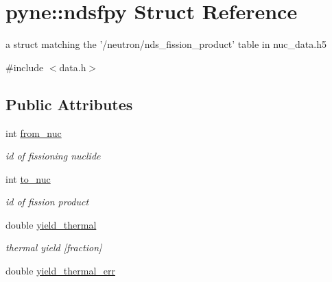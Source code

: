 \hypertarget{structpyne_1_1ndsfpy}{\section{pyne\-:\-:ndsfpy Struct Reference}
\label{structpyne_1_1ndsfpy}
}


a struct matching the '/neutron/nds\-\_\-fission\-\_\-product' table in nuc\-\_\-data.\-h5  




{\ttfamily \#include $<$data.\-h$>$}

\subsection*{Public Attributes}
\begin{DoxyCompactItemize}
\item 
\hypertarget{structpyne_1_1ndsfpy_ad2cb8c35a387624f95c5318f259834db}{int \hyperlink{structpyne_1_1ndsfpy_ad2cb8c35a387624f95c5318f259834db}{from\-\_\-nuc}}\label{structpyne_1_1ndsfpy_ad2cb8c35a387624f95c5318f259834db}

\begin{DoxyCompactList}\small\item\em id of fissioning nuclide \end{DoxyCompactList}\item 
\hypertarget{structpyne_1_1ndsfpy_aeabd96ca1b30be7381853ca0ccd75f31}{int \hyperlink{structpyne_1_1ndsfpy_aeabd96ca1b30be7381853ca0ccd75f31}{to\-\_\-nuc}}\label{structpyne_1_1ndsfpy_aeabd96ca1b30be7381853ca0ccd75f31}

\begin{DoxyCompactList}\small\item\em id of fission product \end{DoxyCompactList}\item 
\hypertarget{structpyne_1_1ndsfpy_a802ebba1436e6e7ca9595e77698310e8}{double \hyperlink{structpyne_1_1ndsfpy_a802ebba1436e6e7ca9595e77698310e8}{yield\-\_\-thermal}}\label{structpyne_1_1ndsfpy_a802ebba1436e6e7ca9595e77698310e8}

\begin{DoxyCompactList}\small\item\em thermal yield \mbox{[}fraction\mbox{]} \end{DoxyCompactList}\item 
\hypertarget{structpyne_1_1ndsfpy_affaf73e5d64d7e9e94f63c6807b7b17e}{double \hyperlink{structpyne_1_1ndsfpy_affaf73e5d64d7e9e94f63c6807b7b17e}{yield\-\_\-thermal\-\_\-err}}\label{structpyne_1_1ndsfpy_affaf73e5d64d7e9e94f63c6807b7b17e}


\end{DoxyCompactItemize}
